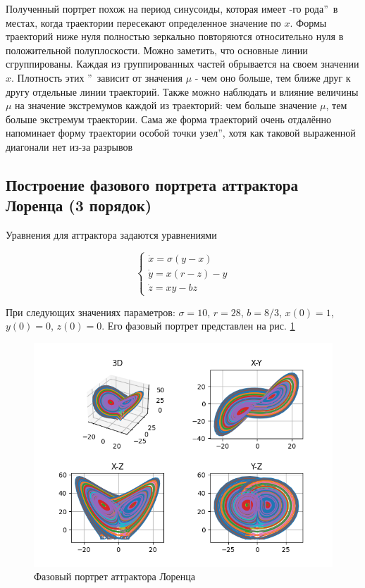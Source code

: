 Полученный портрет похож на период синусоиды, которая имеет -го рода\textquotedblright\
в местах, когда траектории пересекают определенное значение по $x$. Формы траекторий ниже нуля полностью зеркально повторяются относительно нуля в положительной полуплоскости.
Можно заметить, что основные линии сгруппированы. Каждая из группированных частей обрывается на своем значении $x$. Плотность этих \textquotedblleftгрупп\textquotedblright\ зависит от значения $\mu$ - 
чем оно больше, тем ближе друг к другу отдельные линии траекторий. Также можно наблюдать и влияние величины $\mu$ на значение экстремумов
каждой из траекторий: чем больше значение $\mu$, тем больше экстремум траектории. Сама же форма траекторий очень отдалённо напоминает
форму траектории особой точки \textquotedblleftУстойчивый узел\textquotedblright, хотя как таковой выраженной диагонали нет из-за
разрывов

\subsection{Построение фазового портрета аттрактора Лоренца (3 порядок)}

Уравнения для аттрактора задаются уравнениями

$$
\begin{cases}
    \dot x = \sigma (y-x) \\
    \dot y = x (r - z) - y \\
    \dot z = xy - bz
\end{cases}
$$

При следующих значениях параметров: $\sigma = 10$, $r = 28$, $b = 8/3$, $x(0) = 1$, $y(0) = 0$, $z(0) = 0$.
Его фазовый портрет представлен на рис. \ref{fig:24}

\begin{figure}[H]
	\centering
	\includegraphics[width=0.7\linewidth]{body/images/Lorenz-attractor-type-1.png}
	\caption{Фазовый портрет аттрактора Лоренца}
	\label{fig:24}
\end{figure}

